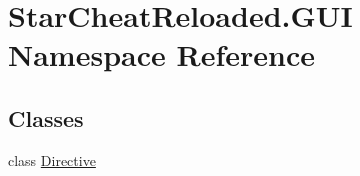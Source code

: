 \hypertarget{namespace_star_cheat_reloaded_1_1_g_u_i}{}\section{Star\+Cheat\+Reloaded.\+G\+UI Namespace Reference}
\label{namespace_star_cheat_reloaded_1_1_g_u_i}
\subsection*{Classes}
\begin{DoxyCompactItemize}
\item 
class \hyperlink{class_star_cheat_reloaded_1_1_g_u_i_1_1_directive}{Directive}
\end{DoxyCompactItemize}
